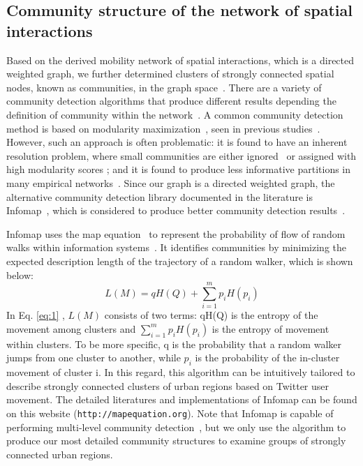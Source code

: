 \documentclass[]{tGIS2e}
\begin{document}
\subsection{Community structure of the network of spatial interactions}
Based on the derived mobility network of spatial interactions, which is a directed weighted graph, we further determined clusters of strongly connected spatial nodes, known as communities, in the graph space~\citep{coscia2011}. 
There are a variety of community detection algorithms that produce different results depending the definition of community within the network~\citep{coscia2011}.
A common community detection method is based on modularity maximization~\citep{newman2006}, seen in previous studies~\citep{hawelka,ratti2010,song2012}.
However, such an approach is often problematic: it is found to have an inherent resolution problem, where small communities are either ignored~\citep{fortunato2007} or assigned with high modularity scores \citep{guimera2004}; and it is found to produce less informative partitions in many empirical networks~\citep{good2010}.
Since our graph is a directed weighted graph, the alternative community detection library documented in the literature is Infomap~\citep{domenico2015,rosvall2008}, which is considered to produce better community detection results~\citep{lancichinetti2009}.

Infomap uses the map equation~\citep{rosvall2010} to represent the probability of flow of random walks within information systems~\citep{rosvall2008}.
It identifies communities by minimizing the expected description length of the trajectory of a random walker, which is shown below:
\begin{equation} \label{eq:1}
L(M)=qH(Q) + \sum_{i=1}^{m} p_{i}H(p_{i})
\end{equation}
In Eq. \eqref{eq:1} , $L(M)$ consists of two terms: qH(Q) is the entropy of the movement among clusters and $ \sum_{i=1}^{m} p_{i}H(p_{i})$ is the entropy of movement within clusters. 
To be more specific, q is the probability that a random walker jumps from one cluster to another, while $p_i$ is the probability of the in-cluster movement of cluster i.
In this regard, this algorithm can be intuitively tailored to describe strongly connected clusters of urban regions based on Twitter user movement.
The detailed literatures and implementations of Infomap can be found on this website ({\tt{http://mapequation.org}}).
Note that Infomap is capable of performing multi-level community detection~\cite{domenico2015}, but we only use the algorithm to produce our most detailed community structures
to examine groups of strongly connected urban regions.
\end{document}
